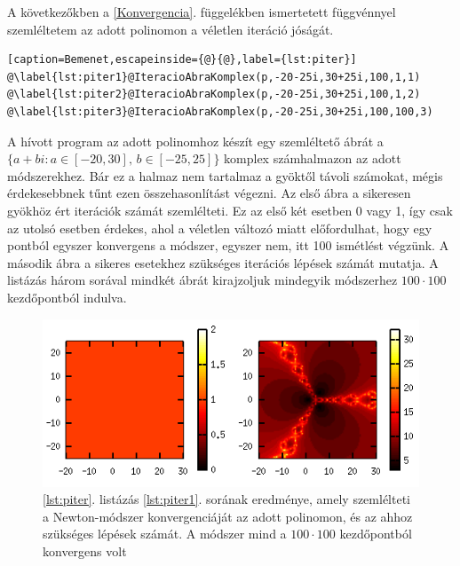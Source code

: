 \documentclass[a4paper,12pt]{report}
\begin{document}
				A következőkben a \ref{Konvergencia}. függelékben ismertetett függvénnyel szemléltetem az adott polinomon a véletlen iteráció jóságát.
				\begin{singlespace}
                \begin{lstlisting}[caption=Bemenet,escapeinside={@}{@},label={lst:piter}]
@\label{lst:piter1}@IteracioAbraKomplex(p,-20-25i,30+25i,100,1,1)
@\label{lst:piter2}@IteracioAbraKomplex(p,-20-25i,30+25i,100,1,2)
@\label{lst:piter3}@IteracioAbraKomplex(p,-20-25i,30+25i,100,100,3)
				\end{lstlisting}
                \end{singlespace}
				A hívott program az adott polinomhoz készít egy szemléltető ábrát a $\{a+bi:a\in[-20,30],\,b\in[-25,25]\}$ komplex számhalmazon az adott módszerekhez. Bár ez a halmaz nem tartalmaz a gyöktől távoli számokat, mégis érdekesebbnek tűnt ezen összehasonlítást végezni. Az első ábra a sikeresen gyökhöz ért iterációk számát szemlélteti. Ez az első két esetben 0 vagy 1, így csak az utolsó esetben érdekes, ahol a véletlen változó miatt előfordulhat, hogy egy pontból egyszer konvergens a módszer, egyszer nem, itt 100 ismétlést végzünk. A második ábra a sikeres esetekhez szükséges iterációs lépések számát mutatja. A listázás három sorával mindkét ábrát kirajzoljuk mindegyik módszerhez $100\cdot 100$ kezdőpontból indulva.
				
				\begin{figure}[h]
					\centering
					\includegraphics[scale=0.7]{p-iter1.png}
					\caption{\ref{lst:piter}. listázás \ref{lst:piter1}. sorának eredménye, amely szemlélteti a Newton-módszer konvergenciáját az adott polinomon, és az ahhoz szükséges lépések számát. A módszer mind a $100\cdot 100$ kezdőpontból konvergens volt} \label{fig:piter1}
				\end{figure}
				
\end{document}
